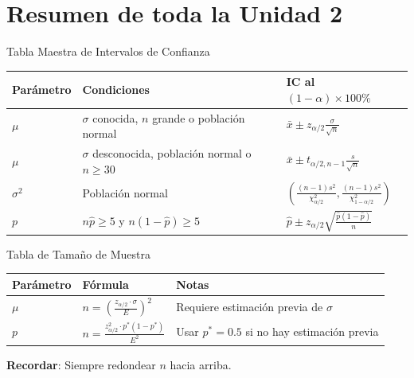 \documentclass[aspectratio=169, 11pt]{beamer}
\begin{document}
\section{Resumen de toda la Unidad 2}

\begin{frame}{Tabla Maestra de Intervalos de Confianza}
\begin{table}
\centering
\footnotesize
\begin{tabular}{p{2cm}p{3.5cm}p{4.5cm}}
\toprule
\textbf{Parámetro} & \textbf{Condiciones} & \textbf{IC al $(1-\alpha) \times 100\%$} \\
\midrule
$\mu$ & $\sigma$ conocida, $n$ grande o población normal & $\bar{x} \pm z_{\alpha/2} \frac{\sigma}{\sqrt{n}}$ \\[0.3cm]
$\mu$ & $\sigma$ desconocida, población normal o $n \geq 30$ & $\bar{x} \pm t_{\alpha/2,n-1} \frac{s}{\sqrt{n}}$ \\[0.3cm]
$\sigma^2$ & Población normal & $\left(\frac{(n-1)s^2}{\chi^2_{\alpha/2}}, \frac{(n-1)s^2}{\chi^2_{1-\alpha/2}}\right)$ \\[0.3cm]
$p$ & $n\hat{p} \geq 5$ y $n(1-\hat{p}) \geq 5$ & $\hat{p} \pm z_{\alpha/2} \sqrt{\frac{\hat{p}(1-\hat{p})}{n}}$ \\
\bottomrule
\end{tabular}
\end{table}
\end{frame}

\begin{frame}{Tabla de Tamaño de Muestra}
\begin{table}
\centering
\small
\begin{tabular}{llp{5cm}}
\toprule
\textbf{Parámetro} & \textbf{Fórmula} & \textbf{Notas} \\
\midrule
$\mu$ & $n = \left(\frac{z_{\alpha/2} \cdot \sigma}{E}\right)^2$ & Requiere estimación previa de $\sigma$ \\[0.3cm]
$p$ & $n = \frac{z_{\alpha/2}^2 \cdot p^*(1-p^*)}{E^2}$ & Usar $p^* = 0.5$ si no hay estimación previa \\
\bottomrule
\end{tabular}
\end{table}

\vspace{0.3cm}
\textbf{Recordar}: Siempre redondear $n$ hacia arriba.
\end{frame}
\end{document}
